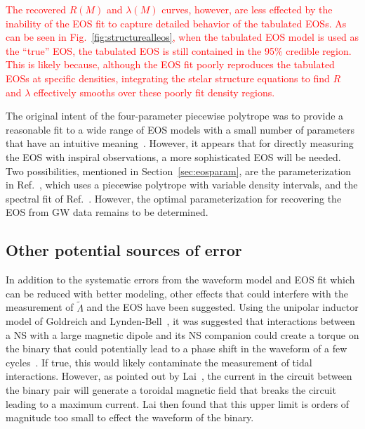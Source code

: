 \documentclass[twocolumn,prd,amssymb,aps,nofootinbib,showpacs,epsf]{revtex4}
\newcommand{\red}{\textcolor{red}}
\begin{document}
\red{The recovered $R(M)$ and $\lambda(M)$ curves, however, are less effected by the inability of the EOS fit to capture detailed behavior of the tabulated EOSs. As can be seen in Fig.~\ref{fig:structurealleos}, when the tabulated EOS model is used as the ``true'' EOS, the tabulated EOS is still contained in the 95\% credible region. This is likely because, although the EOS fit poorly reproduces the tabulated EOSs at specific densities, integrating the stelar structure equations to find $R$ and $\lambda$ effectively smooths over these poorly fit density regions.}

The original intent of the four-parameter piecewise polytrope was to provide a reasonable fit to a wide range of EOS models with a small number of parameters that have an intuitive meaning~\cite{ReadLackey2009}. However, it appears that for directly measuring the EOS with inspiral observations, a more sophisticated EOS will be needed. Two possibilities, mentioned in Section~\ref{sec:eosparam}, are the parameterization in Ref.~\cite{SteinerLattimerBrown2010}, which uses a piecewise polytrope with variable density intervals, and the spectral fit of Ref.~\cite{Lindblom2010}. However, the optimal parameterization for recovering the EOS from GW data remains to be determined.

\subsection{Other potential sources of error}

In addition to the systematic errors from the waveform model and EOS fit which can be reduced with better modeling, other effects that could interfere with the measurement of $\tilde\Lambda$ and the EOS have been suggested. Using the unipolar inductor model of Goldreich and Lynden-Bell~\cite{GoldreichLyndenBell1969}, it was suggested that interactions between a NS with a large magnetic dipole and its NS companion could create a torque on the binary that could potentially lead to a phase shift in the waveform of a few cycles~\cite{Piro2012}. If true, this would likely contaminate the measurement of tidal interactions. However, as pointed out by Lai~\cite{Lai2012}, the current in the circuit between the binary pair will generate a toroidal magnetic field that breaks the circuit leading to a maximum current. Lai then found that this upper limit is orders of magnitude too small to effect the waveform of the binary.
\end{document}
